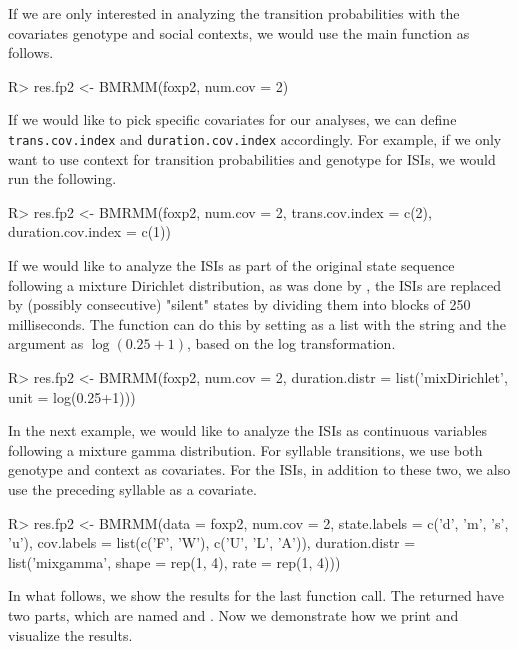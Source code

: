 If we are only interested in analyzing the transition probabilities with the covariates genotype and social contexts, we would use the main function as follows.

\begin{example}
R> res.fp2 <- BMRMM(foxp2, num.cov = 2)
\end{example}


If we would like to pick specific covariates for our analyses, we can define \texttt{trans.cov.index} and \texttt{duration.cov.index} accordingly. 
For example, if we only want to use context for transition probabilities and genotype for ISIs, we would run the following.


\begin{example}
R> res.fp2 <- BMRMM(foxp2, num.cov = 2, 
                    trans.cov.index = c(2), duration.cov.index = c(1))
\end{example}


If we would like to analyze the ISIs as part of the original state sequence following a mixture Dirichlet distribution, as was done by \citet{sarkar2018bayesian}, 
the ISIs are replaced by (possibly consecutive) "silent" states by dividing them into blocks of 250 milliseconds.
The  function can do this by setting  as a list with the string  and the argument  as $\log(0.25+1)$, based on the log transformation.


\begin{example}
R> res.fp2 <- BMRMM(foxp2, num.cov = 2,  
                    duration.distr = list('mixDirichlet', unit = log(0.25+1)))
\end{example}


In the next example, we would like to analyze the ISIs as continuous variables following a mixture gamma distribution.
For syllable transitions, we use both genotype and context as covariates. 
For the ISIs, in addition to these two, we also use the preceding syllable as a covariate. 

\begin{example}
R> res.fp2 <- BMRMM(data = foxp2, num.cov = 2, state.labels = c('d', 'm', 's', 'u'), 
                    cov.labels = list(c('F', 'W'), c('U', 'L', 'A')),
                    duration.distr = list('mixgamma', shape = rep(1, 4), rate = rep(1, 4)))
\end{example}

In what follows, we show the results for the last function call.
The returned  have two parts, which are named   and .
Now we demonstrate how we print and visualize the results.  

